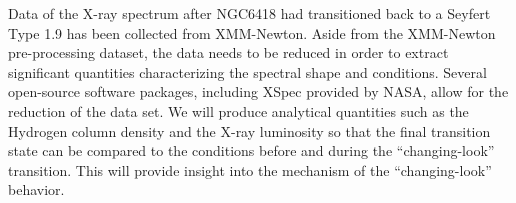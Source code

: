\documentclass[twoside,twocolumn]{article}
\begin{document}
Data of the X-ray spectrum after NGC6418 had transitioned back to a Seyfert Type 1.9 has been collected from XMM-Newton. Aside from the XMM-Newton pre-processing dataset, the data needs to be reduced in order to extract significant quantities characterizing the spectral shape and conditions. Several open-source software packages, including XSpec provided by NASA, allow for the reduction of the data set. We will produce analytical quantities such as the Hydrogen column density and the X-ray luminosity so that the final transition state can be compared to the conditions before and during the ``changing-look'' transition. This will provide insight into the mechanism of the ``changing-look'' behavior.
\end{document}
